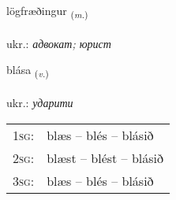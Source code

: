 \documentclass[frontgrid, backgrid]{flacards}\usepackage[]{graphicx}\usepackage[]{xcolor}
\begin{document}
\renewcommand{\flhead}{\vskip5pt \fboxsep=0pt {\small\bfseries\footnotesize Nafnorð | іменник}}
\renewcommand{\fcfoot}{\vskip5pt \fboxsep=0pt \hspace{2pt}{\small\bfseries\footnotesize 3K}}

\renewcommand{\blhead}{\vskip5pt {\small\bfseries\footnotesize Nafnorð | іменник }}
\renewcommand{\bcfoot}{\vskip5pt \hspace{2pt}{\small\bfseries\footnotesize 3K}}


{lögfræðingur \small{\textsubscript{(\textit{m.})}} \\[1ex] %
\textphonetic{[lœxfraiðiŋkʏr]} \\
ukr.: \emph{адвокат; юрист} \\  [2ex]
\renewcommand*{\arraystretch}{0.8}
}

\renewcommand{\flhead}{\vskip5pt \fboxsep=0pt {\small\bfseries\footnotesize Sagnorð | дієслово}}
\renewcommand{\fcfoot}{\vskip5pt \fboxsep=0pt \hspace{2pt}{\small\bfseries\footnotesize 3K}}

\renewcommand{\blhead}{\vskip5pt {\small\bfseries\footnotesize Sagnorð | дієслово }}
\renewcommand{\bcfoot}{\vskip5pt \hspace{2pt}{\small\bfseries\footnotesize 3K}}


{blása \small{\textsubscript{(\textit{v.})}} \\[1ex] %
\textphonetic{[plauːsa]} \\
ukr.: \emph{ударити} \\  [2ex]
\renewcommand*{\arraystretch}{0.8}
\begin{tabular}{p{1cm}l}
\textsc{1sg}: & blæs -- blés -- blásið \\ 
\textsc{2sg}: & blæst -- blést -- blásið \\ 
\textsc{3sg}: & blæs -- blés -- blásið \\ 
\end{tabular}
}
\end{document}
